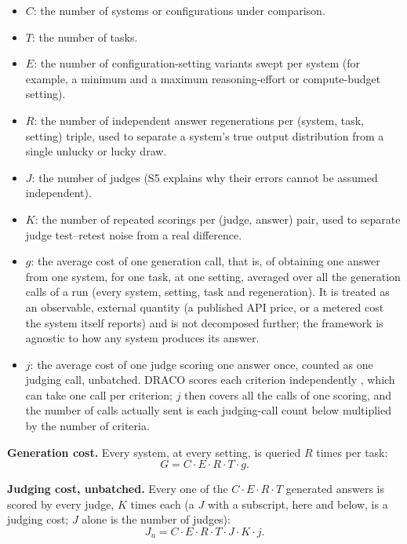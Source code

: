 \documentclass[11pt]{article}
\begin{document}
\begin{itemize}[nosep]
    \item $C$: the number of systems or configurations under comparison.
    \item $T$: the number of tasks.
    \item $E$: the number of configuration-setting variants swept per system (for
    example, a minimum and a maximum reasoning-effort or compute-budget setting).
    \item $R$: the number of independent answer regenerations per (system, task, setting)
    triple, used to separate a system's true output distribution from a single unlucky or
    lucky draw.
    \item $J$: the number of judges (S5 explains why their errors cannot be assumed independent).
    \item $K$: the number of repeated scorings per (judge, answer) pair, used to separate
    judge test--retest noise from a real difference.
    \item $g$: the average cost of one generation call, that is, of obtaining one answer from one system, for one task, at one setting, averaged over all the generation calls of a run (every system, setting, task and regeneration). It is treated as an observable, external quantity (a published API price, or a metered cost the system itself reports) and is not decomposed further; the framework is agnostic to how any system produces its answer.
    \item $j$: the average cost of one judge scoring one answer once, counted as one judging call, unbatched. DRACO scores each criterion independently \citep[Section~4.2]{draco2026}, which can take one call per criterion; $j$ then covers all the calls of one scoring, and the number of calls actually sent is each judging-call count below multiplied by the number of criteria.
\end{itemize}

\textbf{Generation cost.} Every system, at every setting, is queried $R$ times per task:
\begin{equation}
G = C \cdot E \cdot R \cdot T \cdot g.
\label{eq:generation}
\end{equation}

\textbf{Judging cost, unbatched.} Every one of the $C \cdot E \cdot R \cdot T$ generated
answers is scored by every judge, $K$ times each (a $J$ with a subscript, here and below, is a judging cost; $J$ alone is the number of judges):
\begin{equation}
J_u = C \cdot E \cdot R \cdot T \cdot J \cdot K \cdot j.
\label{eq:judging-unbatched}
\end{equation}
\end{document}
